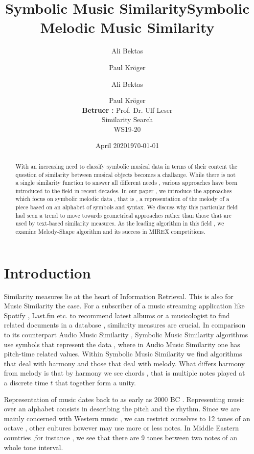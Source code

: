 \documentclass{llncs}
\title{Symbolic Music Similarity}
\author{Ali Bektas \and Paul Kröger}
\date{April 2020}
\title{Symbolic Melodic Music Similarity}
\author{Ali Bektas \and Paul Kröger \\ \textbf{Betruer :} Prof. Dr. Ulf Leser \\ Similarity Search \\ WS19-20}
\date{\today}
\institute{ \vspace{5px} 
  	Humboldt Universität zu Berlin\\}
\begin{document}
	

	\mainmatter

	\maketitle


	\begin{abstract}
	With an increasing need to classify symbolic musical data in terms of their content 
	the question of similarity between musical objects becomes a challange. While 
	there is not a single similarity function to answer all different needs , various approaches
	have been introduced to the field in recent decades. In our paper , we introduce the approaches
	which focus on symbolic melodic data , that is , a representation of the melody of a piece based on an alphabet
	of symbols and syntax. We discuss why this particular field had seen a trend to move towards geometrical approaches rather than those that are used by text-based similarity measures. As the leading algorithm in this field , we examine Melody-Shape algorithm and its success in MIREX competitions.
	\end{abstract}

	\section{Introduction}
		Similarity measures lie at the heart of Information Retrieval. This is also for Music Similarity the case. For a subscriber of a music streaming application like Spotify , Last.fm etc. to recommend latest albums or a musicologist to find related documents in a database , similarity measures are crucial. In comparison to its counterpart Audio Music Similarity , Symbolic Music Similarity algorithms use symbols that represent the data , where in Audio Music Similarity one has pitch-time related values. Within Symbolic Music Similarity we find algorithms that deal with harmony and those that deal with melody. What differs harmony from melody is that by harmony we see chords , that is multiple notes played at a discrete time $t$ that together form a unity.  

		Representation of music dates back to as early as 2000 BC \cite{kil:civ}. Representing music over an alphabet consists in describing the pitch and the rhythm. Since we are mainly concerned with Western music , we can restrict ourselves to 12 tones of an octave , other cultures however may use more or less notes. In Middle Eastern countries ,for instance , we see that there are 9 tones between two notes of an whole tone interval.
\end{document}
